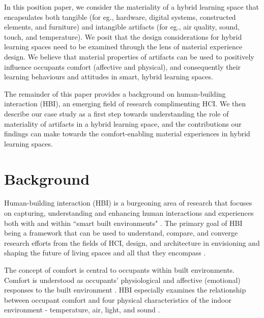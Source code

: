 \documentclass[acmconf, anonymous, review]{acmart}
\begin{document}
In this position paper, we consider the materiality of a hybrid learning space that encapsulates both tangible (for eg., hardware, digital systems, constructed elements, and furniture) and intangible artifacts (for eg., air quality, sound, touch, and temperature). We posit that the design considerations for hybrid learning spaces need to be examined through the lens of material experience design. We believe that material properties of artifacts can be used to positively influence occupants comfort (affective and physical), and consequently their learning behaviours and attitudes in smart, hybrid learning spaces.


The remainder of this paper provides a background on human-building interaction (HBI), an emerging field of research complimenting HCI. We then describe our case study as a first step towards understanding the role of materiality of artifacts in a hybrid learning space, and the contributions our findings can make towards the comfort-enabling material experiences in hybrid learning spaces.


\section{Background}
Human-building interaction (HBI) is a burgeoning area of research that focuses on capturing, understanding and enhancing human interactions and experiences both with and within ``smart built environments" \cite{alavi2016future}. The primary goal of HBI being a framework that can be used to understand, compare, and converge research efforts from the fields of HCI, design, and architecture in envisioning and shaping the future of living spaces and all that they encompass \cite{nembrini2017human, alavi2018artifacts}. 

The concept of comfort is central to occupants within built environments. Comfort is understood as occupants' physiological and affective (emotional) responses to the built environment \cite{alavi2017comfort}. HBI especially examines the relationship between occupant comfort and four physical characteristics of the indoor environment - temperature, air, light, and sound \cite{hawkes2007environmental, bluyssen2009indoor}. 
\end{document}
